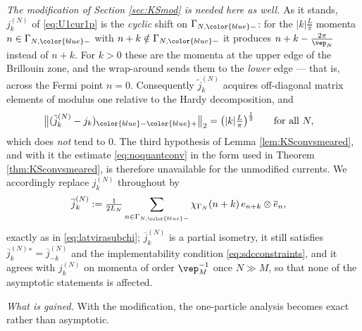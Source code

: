\documentclass[a4paper, 11pt]{article}
\DeclareMathOperator{\1}{\mathds{1}}
\begin{document}
\emph{The modification of Section \ref{sec:KSmod} is needed here as well.} As it stands, $j^{(N)}_{k}$ of \eqref{eq:U1cur1p} is the \emph{cyclic} shift on $\Gamma_{N,{\color{blue}-}}$: for the $|k|\tfrac{L}{\pi}$ momenta $n\in\Gamma_{N,{\color{blue}-}}$ with $n+k\notin\Gamma_{N,{\color{blue}-}}$ it produces $n+k-\tfrac{2\pi}{\vep_{N}}$ instead of $n+k$. For $k>0$ these are the momenta at the upper edge of the Brillouin zone, and the wrap-around sends them to the \emph{lower} edge --- that is, across the Fermi point $n=0$. Consequently $\tilde{j}^{(N)}_{k}$ acquires off-diagonal matrix elements of modulus one relative to the Hardy decomposition, and
\begin{align}
\label{eq:U1curwrap}
\big\|(\tilde{j}^{(N)}_{k}-j_{k})_{{\color{blue}-}{\color{blue}+}}\big\|_{2} & = \big(|k|\tfrac{L}{\pi}\big)^{\frac{1}{2}} \qquad\textup{for all }N,
\end{align}
which does \emph{not} tend to $0$. The third hypothesis of Lemma \ref{lem:KSconvsmeared}, and with it the estimate \eqref{eq:noquantconv} in the form used in Theorem \ref{thm:KSconvsmeared}, is therefore unavailable for the unmodified currents. We accordingly replace $j^{(N)}_{k}$ throughout by
\begin{align}
\label{eq:U1curmod}
\overline{j}^{(N)}_{k} & := \tfrac{1}{2L_{N}}\sum_{n\in\Gamma_{N,{\color{blue}-}}}\chi_{\Gamma_{N}}(n+k)\!\ e_{n+k}\otimes\overline{e}_{n},
\end{align}
exactly as in \eqref{eq:latvirasubchi}; $\overline{j}^{(N)}_{k}$ is a partial isometry, it still satisfies $\overline{j}^{(N)}_{k}{}^{*} = \overline{j}^{(N)}_{-k}$ and the implementability condition \eqref{eq:sdcconstraints}, and it agrees with $j^{(N)}_{k}$ on momenta of order $\vep_{M}^{-1}$ once $N\gg M$, so that none of the asymptotic statements is affected.

\emph{What is gained.} With the modification, the one-particle analysis becomes exact rather than asymptotic.
\end{document}
